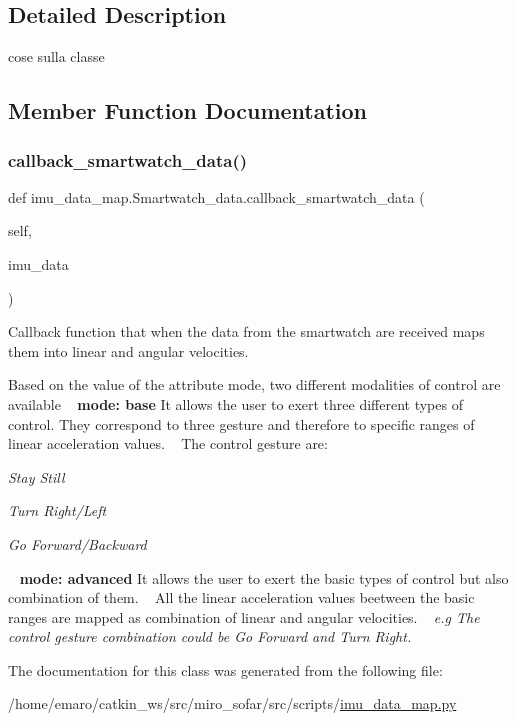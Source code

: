\subsection{Detailed Description}
cose sulla classe 

\subsection{Member Function Documentation}
\mbox{\label{classimu__data__map_1_1Smartwatch__data_ae90cc1ac064c75ea42f00bc34b168708}} 
\subsubsection{\texorpdfstring{callback\+\_\+smartwatch\+\_\+data()}{callback\_smartwatch\_data()}}
{\footnotesize\ttfamily def imu\+\_\+data\+\_\+map.\+Smartwatch\+\_\+data.\+callback\+\_\+smartwatch\+\_\+data (\begin{DoxyParamCaption}\item[{}]{self,  }\item[{}]{imu\+\_\+data }\end{DoxyParamCaption})}



Callback function that when the data from the smartwatch are received maps them into linear and angular velocities. 

Based on the value of the attribute mode, two different modalities of control are available ~\newline
 {\bfseries{mode\+: base}}  It allows the user to exert three different types of control. They correspond to three gesture and therefore to specific ranges of linear acceleration values. ~\newline
 The control gesture are\+: 
\begin{DoxyItemize}
\item {\itshape Stay Still} 
\item {\itshape Turn Right/\+Left} 
\item {\itshape Go Forward/\+Backward}
\end{DoxyItemize} ~\newline
 {\bfseries{mode\+: advanced}}  It allows the user to exert the basic types of control but also combination of them. ~\newline
 All the linear acceleration values beetween the basic ranges are mapped as combination of linear and angular velocities. ~\newline
{\itshape  e.\+g The control gesture combination could be Go Forward and Turn Right.}  

The documentation for this class was generated from the following file\+:\begin{DoxyCompactItemize}
\item 
/home/emaro/catkin\+\_\+ws/src/miro\+\_\+sofar/src/scripts/\mbox{\hyperlink{imu__data__map_8py}{imu\+\_\+data\+\_\+map.\+py}}\end{DoxyCompactItemize}

